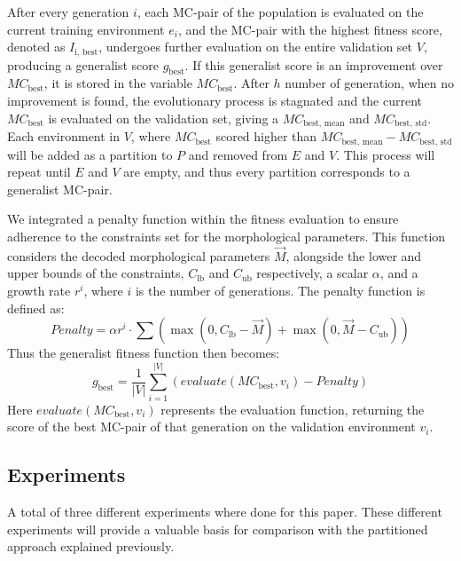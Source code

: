         After every generation $i$, each MC-pair of the population is evaluated on the current training environment $e_i$, and the MC-pair with the highest fitness score, denoted as $I_{\text{i, best}}$, undergoes further evaluation on the entire validation set $V$, producing a generalist score $g_{\text{best}}$. If this generalist score is an improvement over $MC_{\text{best}}$, it is stored in the variable $MC_{\text{best}}$. After $h$ number of generation, when no improvement is found, the evolutionary process is stagnated and the current $MC_{\text{best}}$ is evaluated on the validation set, giving a $MC_{\text{best, mean}}$ and $MC_{\text{best, std}}$. Each environment in $V$, where $MC_{\text{best}}$ scored higher than $MC_{\text{best, mean}} - MC_{\text{best, std}}$ will be added as a partition to $P$ and removed from $E$ and $V$. This process will repeat until $E$ and $V$ are empty, and thus every partition corresponds to a generalist MC-pair. 

        We integrated a penalty function within the fitness evaluation to ensure adherence to the constraints set for the morphological parameters. This function considers the decoded morphological parameters $\overrightarrow{M}$, alongside the lower and upper bounds of the constraints, $C_\text{lb}$ and $C_\text{ub}$ respectively, a scalar $\alpha$, and a growth rate $r^i$, where $i$ is the number of generations. The penalty function is defined as:
        {\small
            \begin{equation}
                Penalty = \alpha r^i \cdot \sum(
                    \max(0, C_\text{lb} - \overrightarrow{M}) + 
                    \max(0, \overrightarrow{M} - C_\text{ub})
                )
            \end{equation}
        }
        Thus the generalist fitness function then becomes:
        {\small
            \begin{equation}
                g_{\text{best}} = \frac{1}{|V|} \sum_{i=1}^{|V|}(
                    evaluate(MC_{\text{best}}, v_i) - Penalty
                ) 
            \end{equation}
        }
        Here $evaluate(MC_{\text{best}}, v_i)$ represents the evaluation function, returning the score of the best MC-pair of that generation on the validation environment $v_i$.

    \subsection{Experiments}
        A total of three different experiments where done for this paper. These different experiments will provide a valuable basis for comparison with the partitioned approach explained previously.
